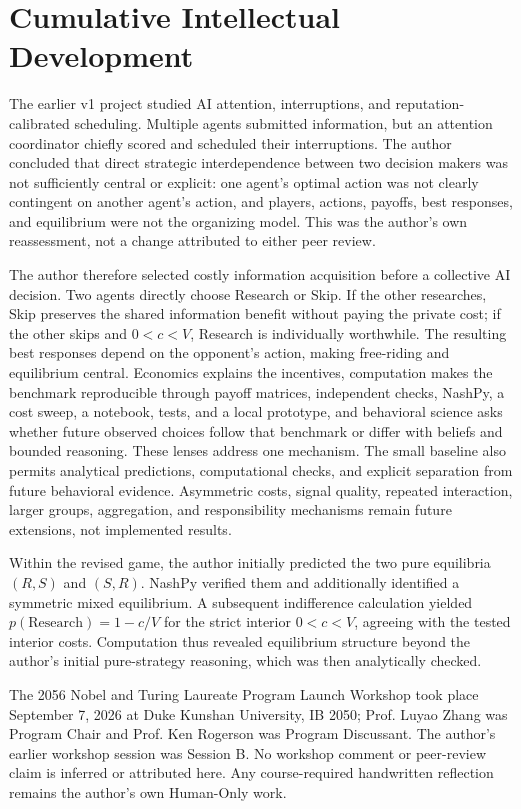 \section{Cumulative Intellectual Development}
\label{app:development}
The earlier v1 project studied AI attention, interruptions, and reputation-calibrated scheduling. Multiple agents submitted information, but an attention coordinator chiefly scored and scheduled their interruptions. The author concluded that direct strategic interdependence between two decision makers was not sufficiently central or explicit: one agent's optimal action was not clearly contingent on another agent's action, and players, actions, payoffs, best responses, and equilibrium were not the organizing model. This was the author's own reassessment, not a change attributed to either peer review.

The author therefore selected costly information acquisition before a collective AI decision. Two agents directly choose Research or Skip. If the other researches, Skip preserves the shared information benefit without paying the private cost; if the other skips and \(0<c<V\), Research is individually worthwhile. The resulting best responses depend on the opponent's action, making free-riding and equilibrium central. Economics explains the incentives, computation makes the benchmark reproducible through payoff matrices, independent checks, NashPy, a cost sweep, a notebook, tests, and a local prototype, and behavioral science asks whether future observed choices follow that benchmark or differ with beliefs and bounded reasoning. These lenses address one mechanism. The small baseline also permits analytical predictions, computational checks, and explicit separation from future behavioral evidence. Asymmetric costs, signal quality, repeated interaction, larger groups, aggregation, and responsibility mechanisms remain future extensions, not implemented results.

Within the revised game, the author initially predicted the two pure equilibria \((R,S)\) and \((S,R)\). NashPy verified them and additionally identified a symmetric mixed equilibrium. A subsequent indifference calculation yielded \(p(\text{Research})=1-c/V\) for the strict interior \(0<c<V\), agreeing with the tested interior costs. Computation thus revealed equilibrium structure beyond the author's initial pure-strategy reasoning, which was then analytically checked.

The 2056 Nobel and Turing Laureate Program Launch Workshop took place September 7, 2026 at Duke Kunshan University, IB 2050; Prof. Luyao Zhang was Program Chair and Prof. Ken Rogerson was Program Discussant. The author's earlier workshop session was Session B. No workshop comment or peer-review claim is inferred or attributed here. Any course-required handwritten reflection remains the author's own Human-Only work.
